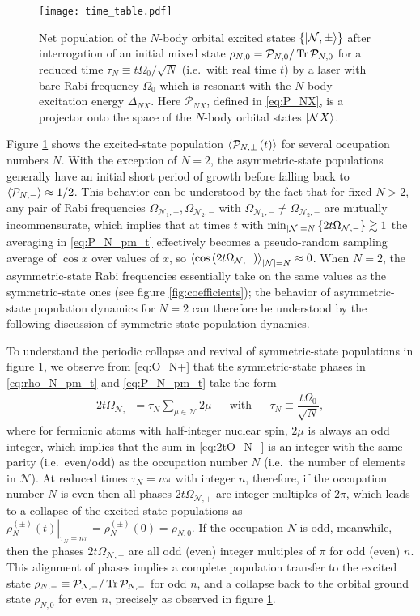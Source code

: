 \documentclass[preprint,showkeys,nofootinbib]{revtex4-1}
\renewcommand{\t}{\text} %
\newcommand{\f}{\dfrac} %
\newcommand{\p}[1]{\left(#1\right)} %
\renewcommand{\set}[1]{\left\{#1\right\}} %
\newcommand{\bk}{\braket} %
\newcommand{\N}{\mathcal{N}}
\renewcommand{\P}{\mathcal{P}}
\newcommand{\1}{\mathds{1}}
\begin{document}
\begin{figure}
  \centering
  \texttt{[image: time\_table.pdf]}
  \caption{\footnotesize Net population of the $N$-body orbital
    excited states $\set{\ket{\N,\pm}}$ after interrogation of an
    initial mixed state $\rho_{N,0}=\P_{N,0}/\Tr\P_{N,0}$ for a
    reduced time $\tau_N\equiv t\Omega_0/\sqrt{N}$ (i.e.~with real
    time $t$) by a laser with bare Rabi frequency $\Omega_0$ which is
    resonant with the $N$-body excitation energy $\Delta_{NX}$.  Here
    $\P_{NX}$, defined in \eqref{eq:P_NX}, is a projector onto the
    space of the $N$-body orbital states $\ket{\N X}$.}
  \label{fig:time}
\end{figure}

Figure \ref{fig:time} shows the excited-state population
$\bk{\P_{N,\pm}\p{t}}$ for several occupation numbers $N$.  With the
exception of $N=2$, the asymmetric-state populations generally have an
initial short period of growth before falling back to
$\bk{\P_{N,-}}\approx1/2$.  This behavior can be understood by the
fact that for fixed $N>2$, any pair of Rabi frequencies
$\Omega_{\N_1,-},\Omega_{\N_2,-}$ with
$\Omega_{\N_1,-}\ne\Omega_{\N_2,-}$ are mutually incommensurate, which
implies that at times $t$ with
$\min_{\abs{\N}=N}\set{2t\Omega_{\N,-}}\gtrsim1$ the averaging in
\eqref{eq:P_N_pm_t} effectively becomes a pseudo-random sampling
average of $\cos x$ over values of $x$, so
$\bk{\cos\p{2t\Omega_{\N,-}}}_{\abs{\N}=N}\approx0$.  When $N=2$, the
asymmetric-state Rabi frequencies essentially take on the same values
as the symmetric-state ones (see figure \ref{fig:coefficients}); the
behavior of asymmetric-state population dynamics for $N=2$ can
therefore be understood by the following discussion of symmetric-state
population dynamics.

To understand the periodic collapse and revival of symmetric-state
populations in figure \ref{fig:time}, we observe from \eqref{eq:O_N+}
that the symmetric-state phases in \eqref{eq:rho_N_pm_t} and
\eqref{eq:P_N_pm_t} take the form
\begin{align}
  2t\Omega_{\N,+} = \tau_N \sum_{\mu\in\N} 2\mu
  &&
  \t{with}
  &&
  \tau_N \equiv \f{t\Omega_0}{\sqrt{N}},
  \label{eq:2tO_N+}
\end{align}
where for fermionic atoms with half-integer nuclear spin, $2\mu$ is
always an odd integer, which implies that the sum in \eqref{eq:2tO_N+}
is an integer with the same parity (i.e.~even/odd) as the occupation
number $N$ (i.e.~the number of elements in $\N$).  At reduced times
$\tau_N=n\pi$ with integer $n$, therefore, if the occupation number
$N$ is even then all phases $2t\Omega_{\N,+}$ are integer multiples of
$2\pi$, which leads to a collapse of the excited-state populations as
$\left.\rho_N^{(\pm)}\p{t}\right|_{\tau_N=n\pi} = \rho_N^{(\pm)}\p{0}
= \rho_{N,0}$.  If the occupation $N$ is odd, meanwhile, then the
phases $2t\Omega_{\N,+}$ are all odd (even) integer multiples of $\pi$
for odd (even) $n$.  This alignment of phases implies a complete
population transfer to the excited state
$\rho_{N,-}\equiv\P_{N,-}/\Tr\P_{N,-}$ for odd $n$, and a collapse
back to the orbital ground state $\rho_{N,0}$ for even $n$, precisely
as observed in figure \ref{fig:time}.
\end{document}
